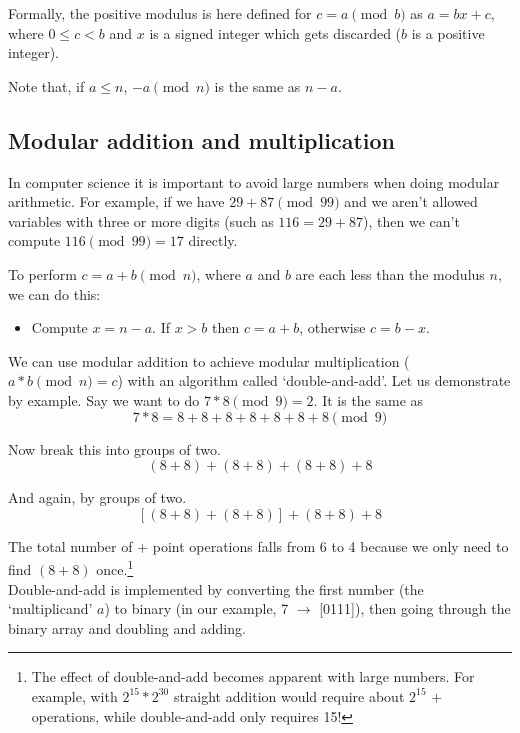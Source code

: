 Formally, the positive modulus is here defined for $c = a \pmod b$ as $a=bx+c$, where $0\leq{c}<{b}$ and $x$ is a signed integer which gets discarded ($b$ is a positive integer).

Note that, if $a \leq n$, $-a \pmod n$ is the same as $n - a$.


\subsection{Modular addition and multiplication}
\label{subsec:modular-addition-multiplication}

In computer science it is important to avoid large numbers when doing modular arithmetic. For example, if we have $29+87 \pmod{99}$ and we aren't allowed variables with three or more digits (such as $116 = 29+87$), then we can't compute $116 \pmod{99} = 17$ directly.

To perform $c = a+b \pmod n$, where $a$ and $b$ are each less than the modulus $n$, we can do this:
\begin{itemize}
	\item Compute $x = n-a$. If $x > b$ then $c = a+b$, otherwise $c = b - x$.
\end{itemize}

We can use modular addition to achieve modular multiplication ($a*b \pmod n = c$) with an algorithm called `double-and-add'. Let us demonstrate by example. Say we want to do $7*8 \pmod 9 = 2$. It is the same as 
\[7*8 = 8+8+8+8+8+8+8 \pmod 9\]

Now break this into groups of two. 
\[(8+8) + (8+8) + (8+8) + 8\]

And again, by groups of two.
\[[(8+8) + (8+8)] + (8+8) + 8\]

The total number of $+$ point operations falls from 6 to 4 because we only need to find $(8+8)$ once.\footnote{The effect of double-and-add becomes apparent with large numbers. For example, with $2^{15} * 2^{30}$ straight addition would require about $2^{15}$ $+$ operations, while double-and-add only requires 15!}\\

Double-and-add is implemented by converting the first number (the `multiplicand' $a$) to binary (in our example, 7 $\rightarrow$ [0111]), then going through the binary array and doubling and adding. 

